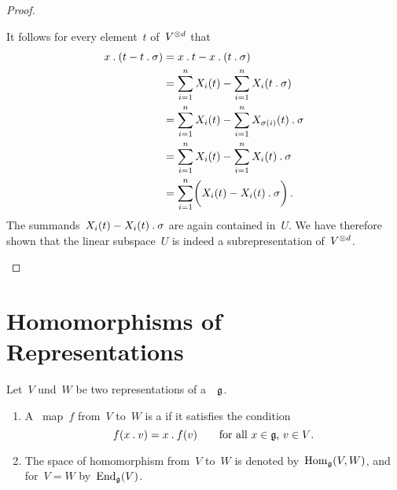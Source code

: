 \begin{proof}
\begin{enumerate}
      
      It follows for every element~$t$ of~$V^{\otimes d}$ that
      \begin{align*}
        x \mathbin{.} ( t - t \mathbin{.} \sigma )
        &=
        x \mathbin{.} t - x \mathbin{.} (t \mathbin{.} \sigma)
        \\
        &=
        \sum_{i=1}^n X_i(t) - \sum_{i=1}^n X_i(t \mathbin{.} \sigma)
        \\
        &=
        \sum_{i=1}^n X_i(t) - \sum_{i=1}^n X_{\sigma(i)}(t) \mathbin{.} \sigma
        \\
        &=
        \sum_{i=1}^n X_i(t) - \sum_{i=1}^n X_i(t) \mathbin{.} \sigma
        \\
        &=
        \sum_{i=1}^n \biggl( X_i(t) - X_i(t) \mathbin{.} \sigma \biggr) \,.
      \end{align*}
      The summands~$X_i(t) - X_i(t) \mathbin{.} \sigma$ are again contained in~$U$.
      We have therefore shown that the linear subspace~$U$ is indeed a subrepresentation of~$V^{\otimes d}$.
    \qedhere
  \end{enumerate}
\end{proof}






\section{Homomorphisms of Representations}


\begin{definition}
  Let~$V$ und~$W$ be two representations of a~{\liealgebra{$\kf$}}~$\mathfrak{g}$.
  \begin{enumerate}
    \item
      A~{\linear{$\kf$}} map~$f$ from~$V$ to~$W$ is a  if it satisfies the condition
      \[
        f(x \mathbin{.} v) = x \mathbin{.} f(v)
        \qquad
        \text{for all~$x \in \mathfrak{g}$,~$v \in V$.}
      \]
    \item
      The space of homomorphism from~$V$ to~$W$ is denoted by~$\operatorname{Hom}_{\mathfrak{g}}(V,W)$, and for~$V = W$ by~$\operatorname{End}_{\mathfrak{g}}(V)$.
  \end{enumerate}
\end{definition}



